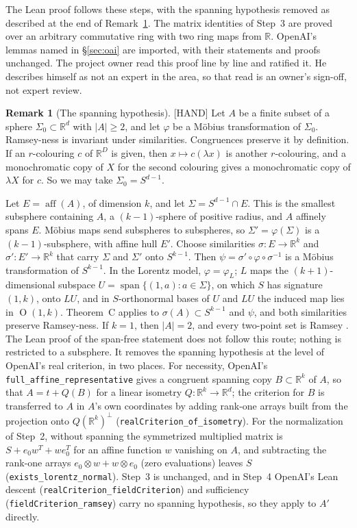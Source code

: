 \documentclass[11pt]{amsart}
\newcommand{\st}[1]{\textsf{[#1]}}
\newcommand{\R}{\mathbb{R}}
\DeclareMathOperator{\Ort}{O}
\DeclareMathOperator{\aff}{aff}
\theoremstyle{plain}
\theoremstyle{definition}
\newtheorem{remark}{Remark}
\begin{document}
The Lean proof follows these steps, with the spanning hypothesis removed as described at the end
of Remark~\ref{rem:wlog}. The matrix identities of Step~3 are proved over an arbitrary
commutative ring with two ring maps from $\R$. OpenAI's lemmas named in \S\ref{sec:oai} are
imported, with their statements and proofs unchanged. The project owner read this proof line by
line and ratified it. He describes himself as not an expert in the area, so that read is an owner's sign-off, not expert review.

\begin{remark}[The spanning hypothesis]\label{rem:wlog}
\st{HAND}
Let $A$ be a finite subset of a sphere $\Sigma_0\subset\R^d$ with $|A|\ge2$, and let $\varphi$ be
a M\"obius transformation of $\Sigma_0$. Ramsey-ness is invariant under similarities. Congruences
preserve it by definition. If an $r$-colouring $c$ of $\R^D$ is given, then
$x\mapsto c(\lambda x)$ is another $r$-colouring, and a monochromatic copy of $X$ for the second
colouring gives a monochromatic copy of $\lambda X$ for $c$. So we may take $\Sigma_0=S^{d-1}$.

Let $E=\aff(A)$, of dimension $k$, and let $\Sigma=S^{d-1}\cap E$. This is the smallest subsphere
containing $A$, a $(k-1)$-sphere of positive radius, and $A$ affinely spans $E$. M\"obius maps send
subspheres to subspheres, so $\Sigma'=\varphi(\Sigma)$ is a $(k-1)$-subsphere, with affine hull
$E'$. Choose similarities $\sigma:E\to\R^k$ and $\sigma':E'\to\R^k$ that carry $\Sigma$ and
$\Sigma'$ onto $S^{k-1}$. Then $\psi=\sigma'\circ\varphi\circ\sigma^{-1}$ is a M\"obius
transformation of $S^{k-1}$. In the Lorentz model, $\varphi=\varphi_L$; $L$ maps the
$(k+1)$-dimensional subspace $U=\operatorname{span}\{(1,a):a\in\Sigma\}$, on which $S$ has
signature $(1,k)$, onto $LU$, and in $S$-orthonormal bases of $U$ and $LU$ the induced map lies in
$\Ort(1,k)$. Theorem~C applies to $\sigma(A)\subset S^{k-1}$ and $\psi$, and both similarities
preserve Ramsey-ness. If $k=1$, then $|A|=2$, and every two-point set is Ramsey
\cite[Cor.~7.4]{OAI172}.
The Lean proof of the span-free statement does not follow this route; nothing
is restricted to a subsphere. It removes the spanning hypothesis at the level of OpenAI's real
criterion, in two places. For necessity, OpenAI's \texttt{full\_affine\_representative} gives a
congruent spanning copy $B\subset\R^k$ of $A$, so that $A=t+Q(B)$ for a linear isometry
$Q:\R^k\to\R^d$; the criterion for $B$ is transferred to $A$ in $A$'s own coordinates by adding
rank-one arrays built from the projection onto $Q(\R^k)^\perp$
(\texttt{realCriterion\_of\_isometry}). For the normalization of Step~2, without spanning the
symmetrized multiplied matrix is $S+e_0w^T+we_0^T$ for an affine function $w$ vanishing on $A$,
and subtracting the rank-one arrays $e_0\otimes w+w\otimes e_0$ (zero evaluations) leaves $S$
(\texttt{exists\_lorentz\_normal}). Step~3 is unchanged, and in Step~4 OpenAI's Lean descent
(\texttt{realCriterion\_fieldCriterion}) and sufficiency (\texttt{fieldCriterion\_ramsey}) carry
no spanning hypothesis, so they apply to $A'$ directly.
\end{remark}
\end{document}
